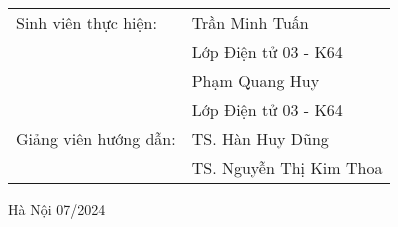 \begin{titlepage}
\begin{center}
  \begin{table}[H]%
       \centering
       \begin{tabular}{l l}
            \fontsize{14pt}{0pt}\selectfont Sinh viên thực hiện:      & \fontsize{14pt}{0pt}\selectfont Trần Minh Tuấn\\
              &\fontsize{14pt}{0pt}\selectfont Lớp Điện tử 03 - K64  \vspace{6pt} \\
              &\fontsize{14pt}{0pt}\selectfont Phạm Quang Huy  \\
              &\fontsize{14pt}{0pt}\selectfont Lớp Điện tử 03 - K64 \vspace{6pt} \\
            \fontsize{14pt}{0pt}\selectfont Giảng viên hướng dẫn: & \fontsize{14pt}{0pt}\selectfont TS. Hàn Huy Dũng \\   
              &\fontsize{14pt}{0pt}\selectfont TS. Nguyễn Thị Kim Thoa \vspace{6pt} \\
       \end{tabular}
  \end{table}
  \vspace{1.3cm} %
  \fontsize{14pt}{0pt}\selectfont Hà Nội 07/2024
  \end{center}
  \end{titlepage}
  
